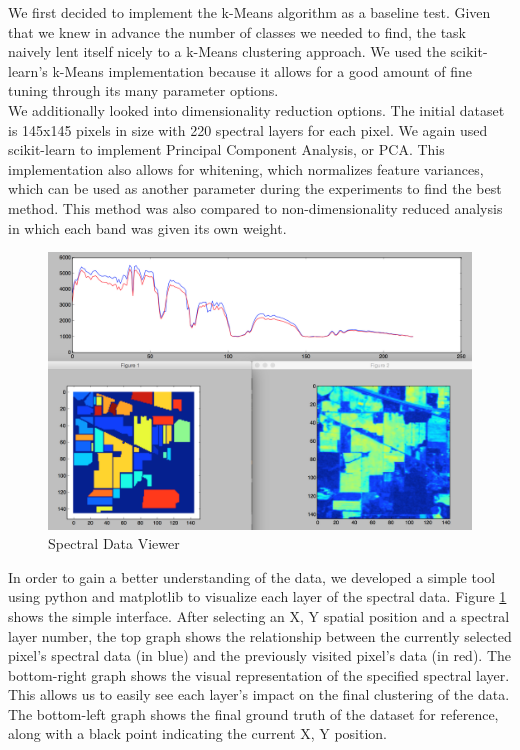 \documentclass[journal]{IEEEtran}
\begin{document}
    We first decided to implement the k-Means algorithm as a baseline test. Given that we knew in advance the number of classes we needed to find, the task naively lent itself nicely to a k-Means clustering approach. We used the scikit-learn's k-Means \cite{ScikitLearnAPI} implementation because it allows for a good amount of fine tuning through its many parameter options.\\

    We additionally looked into dimensionality reduction options. The initial dataset is 145x145 pixels in size with 220 spectral layers for each pixel. We again used scikit-learn to implement Principal Component Analysis, or PCA. This implementation also allows for whitening, which normalizes feature variances, which can be used as another parameter during the experiments to find the best method. This method was also compared to non-dimensionality reduced analysis in which each band was given its own weight.\\

    \begin{figure}[h!]
      \centering\includegraphics[width=\columnwidth]{images/tool.png}
      \caption{Spectral Data Viewer}
      \label{fig:Viewer}
    \end{figure}

    In order to gain a better understanding of the data, we developed a simple tool using python and matplotlib to visualize each layer of the spectral data. Figure \ref{fig:Viewer} shows the simple interface. After selecting an X, Y spatial position and a spectral layer number, the top graph shows the relationship between the currently selected pixel’s spectral data (in blue) and the previously visited pixel’s data (in red). The bottom-right graph shows the visual representation of the specified spectral layer. This allows us to easily see each layer’s impact on the final clustering of the data. The bottom-left graph shows the final ground truth of the dataset for reference, along with a black point indicating the current X, Y position.\\
\end{document}

